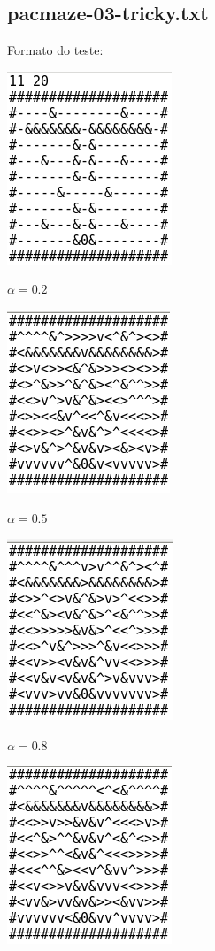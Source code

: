 \documentclass[11pt]{article}
\begin{document}
\subsection{pacmaze-03-tricky.txt}

Formato do teste:

\includegraphics[scale=.5]{tst3-map.png}

$\alpha = 0.2$

\includegraphics[scale=.5]{tst3-02.png}

$\alpha = 0.5$

\includegraphics[scale=.5]{tst3-05.png}

$\alpha = 0.8$

\includegraphics[scale=.5]{tst3-08.png}
\end{document}
